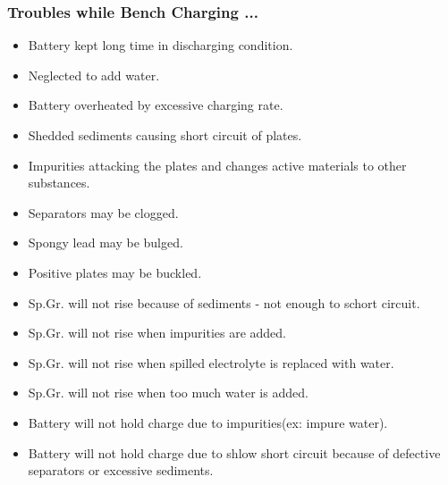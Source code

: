 \documentclass{beamer}
\begin{document}
\begin{frame}     %
  \frametitle{Troubles while Bench Charging ...}
  \fontsize{8pt}{10}\selectfont
  \begin{itemize}
    \item Battery kept long time in discharging condition.
    \item Neglected to add water.
    \item Battery overheated by excessive charging rate.
    \item Shedded sediments causing short circuit of plates.
    \item Impurities attacking the plates and changes active materials to other substances.
    \item Separators may be clogged.
    \item Spongy lead may be bulged.
    \item Positive plates may be buckled.
    \item Sp.Gr. will not rise because of sediments - not enough to schort circuit.
    \item Sp.Gr. will not rise when impurities are added.
    \item Sp.Gr. will not rise when spilled electrolyte is replaced with water.
    \item Sp.Gr. will not rise when too much water is added.
    \item Battery will not hold charge due to impurities(ex: impure water).
    \item Battery will not hold charge due to shlow short circuit because of defective separators or excessive sediments.
  \end{itemize}
\end{frame}
\end{document}
